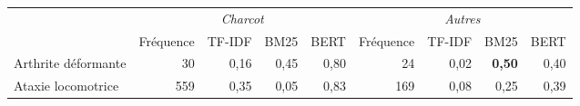\begin{landscape}
\thispagestyle{mylandscape} 
\begin{table}[]
\centering
\begin{tabular}{|l|cccc|cccc|}
\hline
\multicolumn{1}{|c|}{}                                 & \multicolumn{4}{c|}{\cellcolor[HTML]{FFFC9E}\textit{Charcot}}                                        & \multicolumn{4}{c|}{\cellcolor[HTML]{CBCEFB}\textit{Autres}}                                         \\ \cline{2-9} 
\multicolumn{1}{|c|}{\multicolumn{1}{c}{\textit{Terme}}} & \multicolumn{1}{c|}{Fréquence} & \multicolumn{1}{c|}{\textsc{TF-IDF}} & \multicolumn{1}{c|}{\textsc{BM25}} & \textsc{BERT} & \multicolumn{1}{c|}{Fréquence} & \multicolumn{1}{c|}{\textsc{TF-IDF}} & \multicolumn{1}{c|}{\textsc{BM25}} & \textsc{BERT} \\ \hline
Arthrite déformante                                    & \multicolumn{1}{r|}{30}         & \multicolumn{1}{r|}{0,16}   & \multicolumn{1}{r|}{0,45} & \multicolumn{1}{r|}{0,80}      & \multicolumn{1}{r|}{24}         & \multicolumn{1}{r|}{0,02}   & \multicolumn{1}{r|}{\textbf{0,50}} & \multicolumn{1}{r|}{0,40}      \\ \hline
Ataxie locomotrice                                     & \multicolumn{1}{r|}{559}        & \multicolumn{1}{r|}{0,35}   & \multicolumn{1}{r|}{0,05} & \multicolumn{1}{r|}{0,83}      & \multicolumn{1}{r|}{169}        & \multicolumn{1}{r|}{0,08}   & \multicolumn{1}{r|}{0,25} & \multicolumn{1}{r|}{0,39}      \\ \hline

\end{tabular}
\end{table}
\end{landscape}
